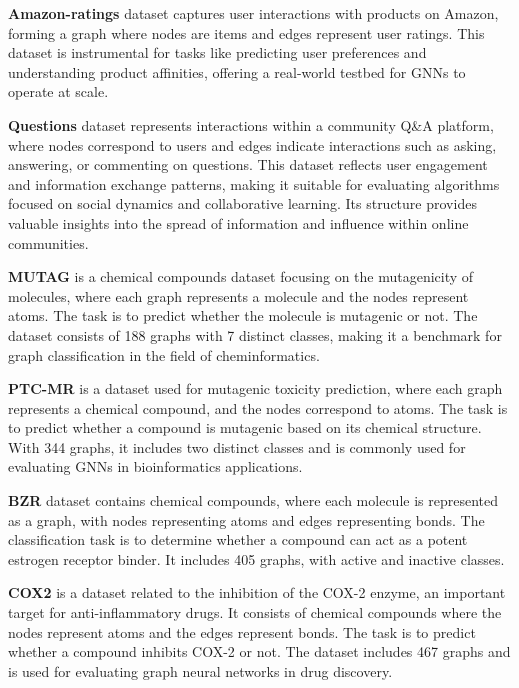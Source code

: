 \textbf{Amazon-ratings} \cite{platonov2023hete_gnn_survey4} dataset captures user interactions with products on Amazon, forming a graph where nodes are items and edges represent user ratings. This dataset is instrumental for tasks like predicting user preferences and understanding product affinities, offering a real-world testbed for GNNs to operate at scale.

\textbf{Questions} \cite{platonov2023hete_gnn_survey4} dataset represents interactions within a community Q\&A platform, where nodes correspond to users and edges indicate interactions such as asking, answering, or commenting on questions. This dataset reflects user engagement and information exchange patterns, making it suitable for evaluating algorithms focused on social dynamics and collaborative learning. Its structure provides valuable insights into the spread of information and influence within online communities.

\textbf{MUTAG} \cite{MUTAG} is a chemical compounds dataset focusing on the mutagenicity of molecules, where each graph represents a molecule and the nodes represent atoms. The task is to predict whether the molecule is mutagenic or not. The dataset consists of 188 graphs with 7 distinct classes, making it a benchmark for graph classification in the field of cheminformatics.

\textbf{PTC-MR} \cite{PTC} is a dataset used for mutagenic toxicity prediction, where each graph represents a chemical compound, and the nodes correspond to atoms. The task is to predict whether a compound is mutagenic based on its chemical structure. With 344 graphs, it includes two distinct classes and is commonly used for evaluating GNNs in bioinformatics applications.

\textbf{BZR} \cite{BZR_COX_DHFR} dataset contains chemical compounds, where each molecule is represented as a graph, with nodes representing atoms and edges representing bonds. The classification task is to determine whether a compound can act as a potent estrogen receptor binder. It includes 405 graphs, with active and inactive classes.

\textbf{COX2} \cite{BZR_COX_DHFR} is a dataset related to the inhibition of the COX-2 enzyme, an important target for anti-inflammatory drugs. It consists of chemical compounds where the nodes represent atoms and the edges represent bonds. The task is to predict whether a compound inhibits COX-2 or not. The dataset includes 467 graphs and is used for evaluating graph neural networks in drug discovery.

